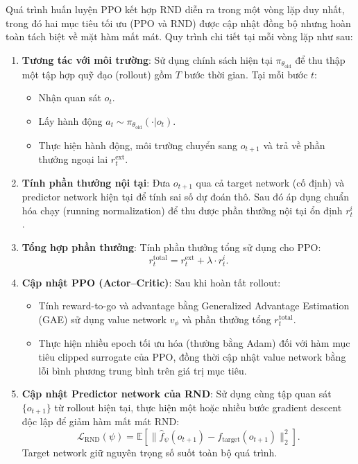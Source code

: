 \documentclass{uetgraduation}
\begin{document}
Quá trình huấn luyện PPO kết hợp RND diễn ra trong một vòng lặp duy nhất, trong đó hai mục tiêu tối ưu (PPO và RND) được cập nhật đồng bộ nhưng hoàn toàn tách biệt về mặt hàm mất mát. Quy trình chi tiết tại mỗi vòng lặp như sau:

\begin{enumerate}
    \item \textbf{Tương tác với môi trường}:  
    Sử dụng chính sách hiện tại $\pi_{\theta_{\text{old}}}$ để thu thập một tập hợp quỹ đạo (rollout) gồm $T$ bước thời gian. Tại mỗi bước $t$:
    \begin{itemize}
        \item Nhận quan sát $o_t$.
        \item Lấy hành động $a_t \sim \pi_{\theta_{\text{old}}}(\cdot|o_t)$.
        \item Thực hiện hành động, môi trường chuyển sang $o_{t+1}$ và trả về phần thưởng ngoại lai $r_t^{\text{ext}}$.
    \end{itemize}

    \item \textbf{Tính phần thưởng nội tại}:  
    Đưa $o_{t+1}$ qua cả target network (cố định) và predictor network hiện tại để tính sai số dự đoán thô. Sau đó áp dụng chuẩn hóa chạy (running normalization) để thu được phần thưởng nội tại ổn định $r_t^i$.

    \item \textbf{Tổng hợp phần thưởng}:  
    Tính phần thưởng tổng sử dụng cho PPO:
    \[
    r_t^{\text{total}} = r_t^{\text{ext}} + \lambda \cdot r_t^i.
    \]

    \item \textbf{Cập nhật PPO (Actor–Critic)}:  
    Sau khi hoàn tất rollout:
    \begin{itemize}
        \item Tính reward-to-go và advantage bằng Generalized Advantage Estimation (GAE) sử dụng value network $v_\phi$ và phần thưởng tổng $r_t^{\text{total}}$.
        \item Thực hiện nhiều epoch tối ưu hóa (thường bằng Adam) đối với hàm mục tiêu clipped surrogate của PPO, đồng thời cập nhật value network bằng lỗi bình phương trung bình trên giá trị mục tiêu.
    \end{itemize}

    \item \textbf{Cập nhật Predictor network của RND}:  
    Sử dụng cùng tập quan sát $\{o_{t+1}\}$ từ rollout hiện tại, thực hiện một hoặc nhiều bước gradient descent độc lập để giảm hàm mất mát RND:
    \[
    \mathcal{L}_{\text{RND}}(\psi) = \mathbb{E} \left[ \| \hat{f}_\psi(o_{t+1}) - f_{\text{target}}(o_{t+1}) \|_2^2 \right].
    \]
    Target network giữ nguyên trọng số suốt toàn bộ quá trình.
\end{enumerate}
\end{document}

